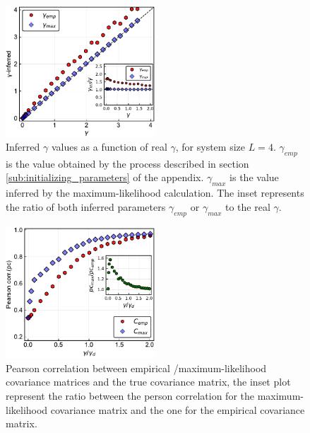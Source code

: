 \documentclass[preprint,amsmath,amssymb,superscriptaddress,showpacs,pre]{revtex4-1}
\begin{document}
\begin{figure}[!htb]
	\centering
	\includegraphics[keepaspectratio=true,width=0.5\textwidth]{Figures/scatter_gamma_L4_100.pdf}
	\caption{Inferred $\gamma$ values as a function of real $\gamma$, for system size $L=4$. $\gamma_{emp}$ is the value obtained by the process described in section \ref{sub:initializing_parameters} of the appendix. $\gamma_{max}$ is the value inferred by the maximum-likelihood calculation. 
	The inset represents the ratio of both inferred parameters $\gamma_{emp}$ or $\gamma_{max}$ to the real $\gamma$.}
	\label{fig:scatter_gamma_L4}
\end{figure}



\begin{figure}[!htb]
	\centering
	\includegraphics[keepaspectratio=true,width=0.5\textwidth]{Figures/corr_C_L10_balanced_tree_100_rep.pdf}
	\caption{ Pearson correlation between empirical /maximum-likelihood   covariance matrices and the true covariance matrix, the inset plot represent the ratio between the person correlation for the  maximum-likelihood covariance matrix and the one for the empirical covariance matrix.}
	\label{fig:pears_L10}
\end{figure}
\end{document}
